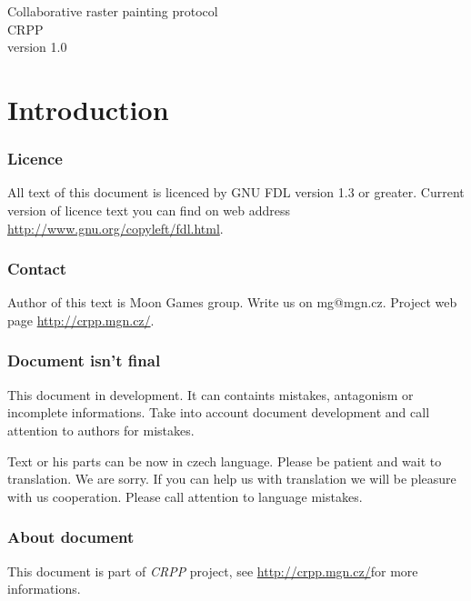 \documentclass[12pt,oneside,a4paper]{report}
\newcommand{\webURL}{\url{http://crpp.mgn.cz/}}
\begin{document}
\thispagestyle{empty}
\begin{center}

{\Huge Collaborative raster painting protocol}\\[50pt]

{\Huge CRPP}\\[100pt]

{\Large version 1.0}

\end{center}
\newpage

\tableofcontents
\newpage

\part{Introduction}

\section{Licence}

All text of this document is licenced by GNU FDL version 1.3 or greater. Current version of licence text you can find on web address \url{http://www.gnu.org/copyleft/fdl.html}.

\section{Contact}

Author of this text is Moon Games group. Write us on mg@mgn.cz. Project web page \webURL{}.

\section{Document isn't final}

This document in development. It can containts mistakes, antagonism or incomplete informations. Take into account document development and call attention to authors for mistakes.

Text or his parts can be now in czech language. Please be patient and wait to translation. We are sorry. If you can help us with translation we will be pleasure with us cooperation. Please call attention to language mistakes.

\section{About document}

This document is part of \emph{CRPP} project, see \webURL for more informations.
\end{document}
